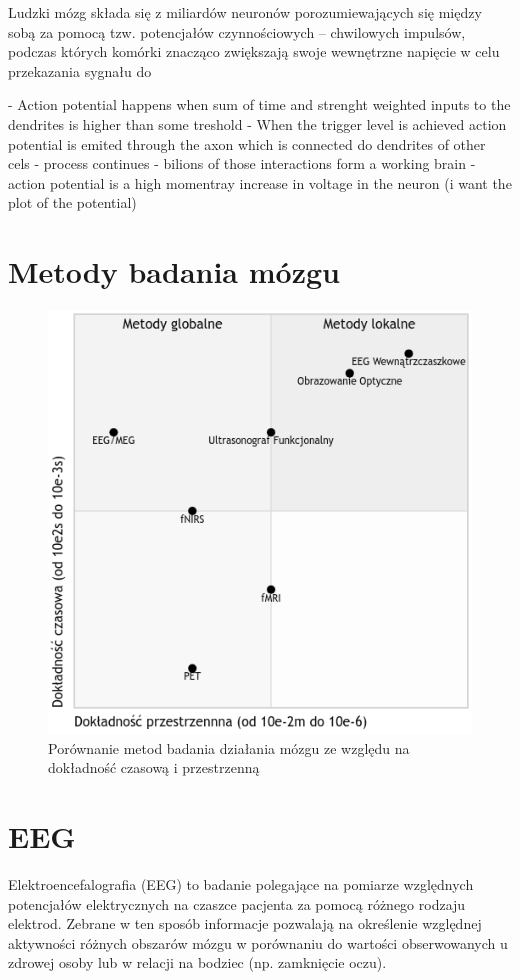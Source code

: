 \documentclass{./assets/wfis}
\begin{document}
Ludzki mózg składa się z miliardów neuronów porozumiewających się między sobą za pomocą tzw. potencjałów czynnościowych – chwilowych impulsów, podczas których komórki znacząco zwiększają swoje wewnętrzne napięcie w celu przekazania sygnału do

- Action potential happens when sum of time and strenght weighted inputs to the dendrites is higher than some treshold
- When the trigger level is achieved action potential is emited through the axon which is connected do dendrites of other cels - process continues
- bilions of those interactions form a working brain
- action potential is a high momentray increase in voltage in the neuron (i want the plot of the potential)

\section{Metody badania mózgu}

\begin{figure}[h]
    \centering
    \includegraphics[width=0.5\columnwidth]{thesis/assets/porownanie_metod_badania_mozgu.png}
    \caption{Porównanie metod badania działania mózgu ze względu na dokładność czasową i przestrzenną}
    \label{fig:brain-imaging-comparasion}
\end{figure}


\section{EEG}
Elektroencefalografia (EEG) to badanie polegające na pomiarze względnych potencjałów elektrycznych na czaszce pacjenta za pomocą różnego rodzaju elektrod. Zebrane w ten sposób informacje pozwalają na określenie względnej aktywności różnych obszarów mózgu w porównaniu do wartości obserwowanych u zdrowej osoby lub w relacji na bodziec (np. zamknięcie oczu).
\end{document}
